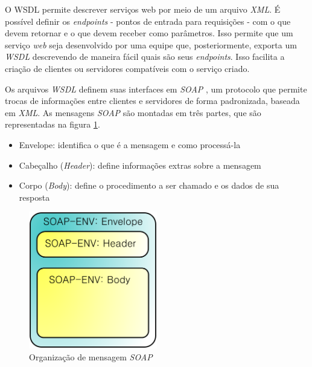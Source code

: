       O WSDL \cite{w3c-spec-wsdl} permite descrever serviços web por meio de um arquivo \textit{\ac{XML}}. É possível definir os \textit{endpoints} - pontos de entrada para requisições - com o que devem retornar e o que devem receber como parâmetros. Isso permite que um serviço \textit{web} seja desenvolvido por uma equipe que, posteriormente, exporta um \textit{\ac{WSDL}} descrevendo de maneira fácil quais são seus \textit{endpoints}. Isso facilita a criação de clientes ou servidores compatíveis com o serviço criado.

      Os arquivos \textit{\ac{WSDL}} definem suas interfaces em \textit{\ac{SOAP}} \cite{w3c-spec-soap}, um protocolo que permite trocas de informações entre clientes e servidores de forma padronizada, baseada em \textit{\ac{XML}}. As mensagens \textit{\ac{SOAP}} são montadas em três partes, que são representadas na figura \ref{fig:soap}.
      \begin{itemize}
        \item Envelope: identifica o que é a mensagem e como processá-la
        \item Cabeçalho (\textit{Header}): define informações extras sobre a mensagem
        \item Corpo (\textit{Body}): define o procedimento a ser chamado e os dados de sua resposta
      \end{itemize}

      \begin{figure}[H]
          \begin{center}
            \includegraphics[width=0.5\textwidth,natwidth=585,natheight=180]{assets/images/soap.png}
            \caption{Organização de mensagem \textit{SOAP}}
            \label{fig:soap}
          \end{center}
        \end{figure}

